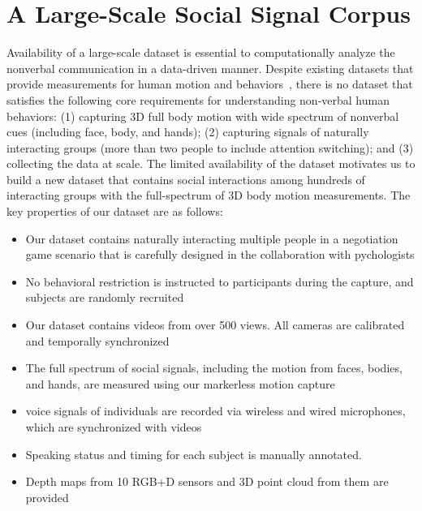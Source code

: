 
\chapter{A Large-Scale Social Signal Corpus}
\label{chapter:dataset}
Availability of a large-scale dataset is essential to computationally analyze the nonverbal communication in a data-driven manner. Despite existing datasets that provide measurements for human motion and behaviors~\cite{carletta2005ami, Lepri-12, Zen-10,Cristani-11, SALSA-15, h36m_pami}, there is no dataset that satisfies the following core requirements for understanding non-verbal human behaviors: (1) capturing 3D full body motion with wide spectrum of nonverbal cues (including face, body, and hands); (2) capturing signals of naturally interacting groups (more than two people to include attention switching); and (3) collecting the data at scale. The limited availability of the dataset motivates us to build a new dataset that contains social interactions among hundreds of interacting groups with the full-spectrum of 3D body motion measurements. The key properties of our dataset are as follows:
\begin{itemize}
	\item Our dataset contains naturally interacting multiple people in a negotiation game scenario that is carefully designed in the collaboration with pychologists
	\item No behavioral restriction is instructed to participants during the capture, and subjects are randomly recruited
	\item Our dataset contains videos from over 500 views. All cameras are calibrated and temporally synchronized
	\item The full spectrum of social signals, including the motion from faces, bodies, and hands, are measured using our markerless motion capture~\cite{joo2017panoptic, joo2018}
	\item voice signals of individuals are recorded via wireless and wired microphones, which are synchronized with videos
	\item Speaking status and timing for each subject is manually annotated.
	\item Depth maps from 10 RGB+D sensors and 3D point cloud from them are provided
\end{itemize}

